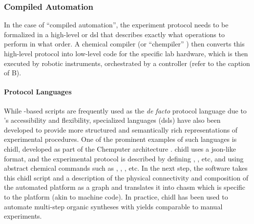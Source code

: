 \subsubsection{Compiled Automation}
In the case of \enquote{compiled automation}, the experiment protocol needs to be formalized in a high-level or \gls{dsl} that describes exactly what operations to perform in what order. 
A chemical compiler (or \enquote{chempiler} \autocite{steiner2019organic}) then converts this high-level protocol into low-level code for the specific lab hardware, which is then executed by robotic instruments, orchestrated by a controller (refer to the caption of B). 

\paragraph{Protocol Languages} While -based scripts are frequently used as the \textit{de facto} protocol language due to 's accessibility and flexibility,\autocite{pylabrobot,vriza2023polybot, wang2025polybot} specialized languages (\glspl{dsl}) have also been developed to provide more structured and semantically rich representations of experimental procedures.\autocite{wang2022ulsa, ananthanarayanan2010biocoder, autoprotocol2023, Park2023CMDL} 
One of the prominent examples of such languages is \gls{chidl}\autocite{xdl2023spec}, developed as part of the Chemputer architecture \autocite{steiner2019organic, mehr2020universal, hammer2021chemputation}. 
\gls{chidl} uses a \gls{json}-like format, and the experimental protocol is described by defining , , etc, and using abstract chemical commands such as , , , etc. 
In the next step, the  software takes this \gls{chidl} script and a description of the physical connectivity and composition of the automated platform as a graph and translates it into \gls{chasm} which is specific to the platform (akin to machine code). 
In practice, \gls{chidl}  has been used to automate multi-step organic syntheses with yields comparable to manual experiments.\autocite{mehr2020universal}  


